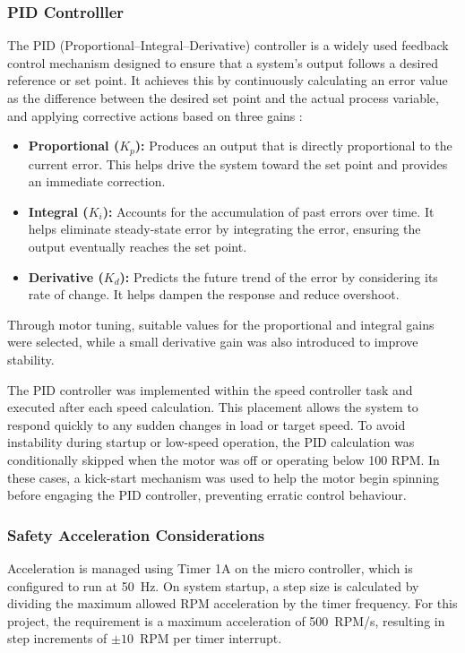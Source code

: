 \documentclass[a4paper, 11pt, titlepage]{article}
\begin{document}
\subsubsection{PID Controlller}
The PID (Proportional–Integral–Derivative) controller is a widely used feedback control mechanism designed to ensure that a system's output follows a desired reference or set point. It achieves this by continuously calculating an error value as the difference between the desired set point and the actual process variable, and applying corrective actions based on three gains \parencite{pidController}:
\begin{itemize}
    \item \textbf{Proportional ($K_p$):} Produces an output that is directly proportional to the current error. This helps drive the system toward the set point and provides an immediate correction.
    \item \textbf{Integral ($K_i$):} Accounts for the accumulation of past errors over time. It helps eliminate steady-state error by integrating the error, ensuring the output eventually reaches the set point.
    \item \textbf{Derivative ($K_d$):} Predicts the future trend of the error by considering its rate of change. It helps dampen the response and reduce overshoot.
\end{itemize}

Through motor tuning, suitable values for the proportional and integral gains were selected, while a small derivative gain was also introduced to improve stability.

The PID controller was implemented within the speed controller task and executed after each speed calculation. This placement allows the system to respond quickly to any sudden changes in load or target speed. To avoid instability during startup or low-speed operation, the PID calculation was conditionally skipped when the motor was off or operating below 100 RPM. In these cases, a kick-start mechanism was used to help the motor begin spinning before engaging the PID controller, preventing erratic control behaviour.
\subsubsection{Safety Acceleration Considerations}
Acceleration is managed using Timer 1A on the micro controller, which is configured to run at 50~Hz. On system startup, a step size is calculated by dividing the maximum allowed RPM acceleration by the timer frequency. For this project, the requirement is a maximum acceleration of 500~RPM/s, resulting in step increments of $\pm 10$~RPM per timer interrupt.
\end{document}

